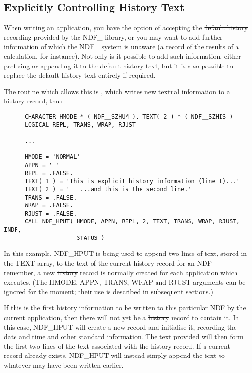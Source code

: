 \subsection{\label{ss:controllinghistory}Explicitly Controlling History Text}

When writing an application, you have the option of accepting the
\st{default history recording\/} provided by the NDF\_ library, or you may
want to add further information of which the NDF\_ system is unaware
(a record of the results of a calculation, for instance).  Not only is
it possible to add such information, either prefixing or appending it
to the default \st{history\/} text, but it is also possible to replace the
default \st{history\/} text entirely if required.

The routine which allows this is , which writes new textual
information to a \st{history\/} record, thus:

\small
\begin{verbatim}
      CHARACTER HMODE * ( NDF__SZHUM ), TEXT( 2 ) * ( NDF__SZHIS )
      LOGICAL REPL, TRANS, WRAP, RJUST

      ...

      HMODE = 'NORMAL'
      APPN = ' '
      REPL = .FALSE.
      TEXT( 1 ) = 'This is explicit history information (line 1)...'
      TEXT( 2 ) = '   ...and this is the second line.'
      TRANS = .FALSE.
      WRAP = .FALSE.
      RJUST = .FALSE.
      CALL NDF_HPUT( HMODE, APPN, REPL, 2, TEXT, TRANS, WRAP, RJUST, INDF,
                     STATUS )
\end{verbatim}
\normalsize

In this example, NDF\_HPUT is being used to append two lines of text,
stored in the TEXT array, to the text of the current \st{history\/}
record for an NDF -- remember, a new \st{history\/} record is normally
created for each application which executes. (The HMODE, APPN, TRANS,
WRAP and RJUST arguments can be ignored for the moment; their use is
described in subsequent sections.)

If this is the first history information to be written to this
particular NDF by the current application, then there will not yet be
a \st{history\/} record to contain it. In this case, NDF\_HPUT will create a
new record and initialise it, recording the date and time and other
standard information. The text provided will then form the first two
lines of the text associated with the \st{history\/} record. If a current
record already exists, NDF\_HPUT will instead simply append the text
to whatever may have been written earlier.

